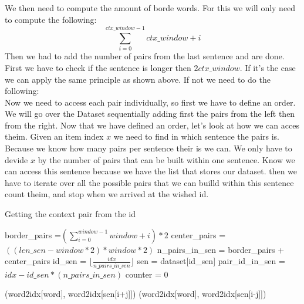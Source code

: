 We then need to compute the amount of borde words. For this we will only need to compute the following:
\begin{equation}
\sum_{i=0}^{ctx\_window -1} ctx\_window + i
\end{equation}
 Then we had to add the number of pairs from the last sentence and are done. First  we have to check if the sentence is longer then $2 ctx\_window$. 
 If it's the case we can apply the same principle as shown above. If not we need to do the following:\\
Now we need to access each pair individually, so first we have to define an order. We will go over the Dataset sequentially adding first the pairs from the left then from the right. Now that we have defined an order, let's look at how we can acces theim. Given an item index $x$ we need to find in which sentence the pairs is. Because we know how many pairs per sentence their is we can. We only have to devide $x$ by the number of pairs that can be built within one sentence. Know we can access this sentence because we have the list that stores our dataset. then we have to iterate over all the possible pairs that we can builld within this sentence count theim, and stop when we arrived at the wished id. 

\begin{algorithm}
\caption{Getting the context pair from the id}
\label{alg1}
\begin{algorithmic}[1]
 \STATE border\_pairs =$(\sum_{i=0}^{window -1} window + i)*2$
        \STATE center\_pairs =$ ((len\_sen - window*2)*window*2)$
        \STATE n\_pairs\_in\_sen = border\_pairs + center\_pairs
        \STATE id\_sen = $\lfloor \frac{idx}{n\_pairs\_in\_sen} \rfloor$
\STATE         sen  = dataset[id\_sen]
       \STATE  pair\_id\_in\_sen = $idx - id\_sen*(n\_pairs\_in\_sen)$
        \STATE counter = 0

\RETURN (word2idx[word], word2idx[sen[i+j]])
\ENDIF
\ENDIF
{}
\RETURN (word2idx[word], word2idx[sen[i-j]])
\ENDIF
\ENDIF
\ENDFOR
\ENDFOR
\end{algorithmic}
\end{algorithm}

